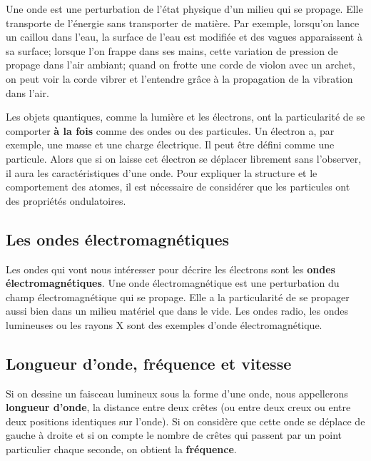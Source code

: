 \documentclass[
  11pt,
  french,
  a4paper,
  openany]{book}
\begin{document}
Une onde est une perturbation de l'état physique d'un milieu qui se propage. Elle transporte de l'énergie sans transporter de matière. Par exemple, lorsqu'on lance un caillou dans l'eau, la surface de l'eau est modifiée et des vagues apparaissent à sa surface; lorsque l'on frappe dans ses mains, cette variation de pression de propage dans l'air ambiant; quand on frotte une corde de violon avec un archet, on peut voir la corde vibrer et l'entendre grâce à la propagation de la vibration dans l'air.

Les objets quantiques, comme la lumière et les électrons, ont la particularité de se comporter \textbf{à la fois} comme des ondes ou des particules. Un électron a, par exemple, une masse et une charge électrique. Il peut être défini comme une particule. Alors que si on laisse cet électron se déplacer librement sans l'observer, il aura les caractéristiques d'une onde. Pour expliquer la structure et le comportement des atomes, il est nécessaire de considérer que les particules ont des propriétés ondulatoires.

\hypertarget{les-ondes-uxe9lectromagnuxe9tiques}{%
\subsection{Les ondes électromagnétiques}\label{les-ondes-uxe9lectromagnuxe9tiques}}

Les ondes qui vont nous intéresser pour décrire les électrons sont les \textbf{ondes électromagnétiques}. Une onde électromagnétique est une perturbation du champ électromagnétique qui se propage. Elle a la particularité de se propager aussi bien dans un milieu matériel que dans le vide. Les ondes radio, les ondes lumineuses ou les rayons X sont des exemples d'onde électromagnétique.

\hypertarget{longueur-donde-fruxe9quence-et-vitesse}{%
\subsection{Longueur d'onde, fréquence et vitesse}\label{longueur-donde-fruxe9quence-et-vitesse}}

Si on dessine un faisceau lumineux sous la forme d'une onde, nous appellerons \textbf{longueur d'onde}, la distance entre deux crêtes (ou entre deux creux ou entre deux positions identiques sur l'onde). Si on considère que cette onde se déplace de gauche à droite et si on compte le nombre de crêtes qui passent par un point particulier chaque seconde, on obtient la \textbf{fréquence}.
\end{document}
